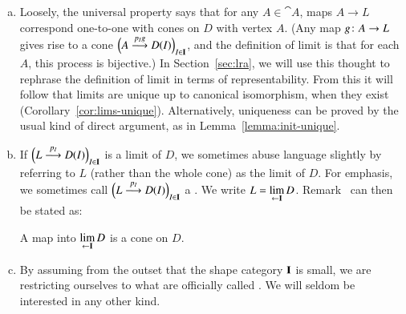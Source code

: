 \begin{remarks}
\label{rmks:defn-lim}
\begin{enumerate}[(b)]
\item
\label{rmk:defn-lim-univ}
Loosely, the universal property says that for any $A \in \cat{A}$, maps $A
\to L$ correspond one-to-one with cones on $D$ with vertex $A$.  (Any map
$g\from A \to L$ gives rise to a cone $\Bigl( A \stackrel{p_I g}{\longrightarrow} D(I) \Bigr)_{I
  \in \mathbf{I}}$, and the definition of limit is that for each $A$, this
process is bijective.)  In Section~\ref{sec:lra}, we will use this thought
to rephrase the definition of limit in terms of representability.  From
this it will follow that limits are unique up to canonical isomorphism,
when they exist (Corollary~\ref{cor:lims-unique}).  Alternatively,
uniqueness can be proved by the usual kind of direct argument, as in
Lemma~\ref{lemma:init-unique}.

\item
If $\Bigl( L \stackrel{p_I}{\longrightarrow} D(I) \Bigr)_{I \in \mathbf{I}}$ is a limit of $D$, we
sometimes abuse language slightly by referring to $L$ (rather than the
whole cone) as the limit%
%
%
of $D$.  For emphasis, we sometimes call $\Bigl( L \stackrel{p_I}{\longrightarrow} D(I)
\Bigr)_{I \in \mathbf{I}}$ a .  We write $L = \lim\limits_{\leftarrow \mathbf{I}} D$.%
%
%
Remark~ can then be stated as:
%
\begin{slogan}
A map into $\lim\limits_{\leftarrow \mathbf{I}} D$ is a cone on $D$.
\end{slogan}

\item
\label{rmks:defn-lim:small}
By assuming from the outset that the shape category $\mathbf{I}$ is small, we
are restricting ourselves to what are officially called .  We will seldom be interested in any other kind.
\end{enumerate}
\end{remarks}

